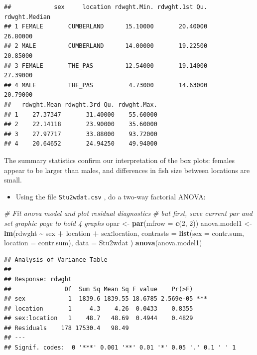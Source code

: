 \documentclass[
  12pt,
]{book}
\newenvironment{Shaded}{\begin{snugshade}}{\end{snugshade}}
\newcommand{\CommentTok}[1]{\textcolor[rgb]{0.56,0.35,0.01}{\textit{#1}}}
\newcommand{\DataTypeTok}[1]{\textcolor[rgb]{0.13,0.29,0.53}{#1}}
\newcommand{\DecValTok}[1]{\textcolor[rgb]{0.00,0.00,0.81}{#1}}
\newcommand{\KeywordTok}[1]{\textcolor[rgb]{0.13,0.29,0.53}{\textbf{#1}}}
\newcommand{\NormalTok}[1]{#1}
\newcommand{\OperatorTok}[1]{\textcolor[rgb]{0.81,0.36,0.00}{\textbf{#1}}}
\newcommand{\StringTok}[1]{\textcolor[rgb]{0.31,0.60,0.02}{#1}}
\providecommand{\tightlist}{%
  \setlength{\itemsep}{0pt}\setlength{\parskip}{0pt}}
\begin{document}
\begin{verbatim}
##            sex     location rdwght.Min. rdwght.1st Qu. rdwght.Median
## 1 FEMALE       CUMBERLAND      15.10000       20.40000      26.80000
## 2 MALE         CUMBERLAND      14.00000       19.22500      20.85000
## 3 FEMALE       THE_PAS         12.54000       19.14000      27.39000
## 4 MALE         THE_PAS          4.73000       14.63000      20.79000
##   rdwght.Mean rdwght.3rd Qu. rdwght.Max.
## 1    27.37347       31.40000    55.60000
## 2    22.14118       23.90000    35.60000
## 3    27.97717       33.88000    93.72000
## 4    20.64652       24.94250    49.94000
\end{verbatim}

The summary statistics confirm our interpretation of the box plots: females appear to be larger than males, and differences in fish size between locations are small.

\begin{itemize}
\tightlist
\item
  Using the file \texttt{Stu2wdat.csv} , do a two-way factorial ANOVA:
\end{itemize}

\begin{Shaded}
\begin{Highlighting}[]
\CommentTok{\# Fit anova model and plot residual diagnostics}
\CommentTok{\# but first, save current par and set graphic page to hold 4 graphs}
\NormalTok{opar \textless{}{-}}\StringTok{ }\KeywordTok{par}\NormalTok{(}\DataTypeTok{mfrow =} \KeywordTok{c}\NormalTok{(}\DecValTok{2}\NormalTok{, }\DecValTok{2}\NormalTok{))}
\NormalTok{anova.model1 \textless{}{-}}\StringTok{ }\KeywordTok{lm}\NormalTok{(rdwght }\OperatorTok{\textasciitilde{}}\StringTok{ }\NormalTok{sex }\OperatorTok{+}\StringTok{ }\NormalTok{location }\OperatorTok{+}\StringTok{ }\NormalTok{sex}\OperatorTok{:}\NormalTok{location,}
  \DataTypeTok{contrasts =} \KeywordTok{list}\NormalTok{(}\DataTypeTok{sex =}\NormalTok{ contr.sum, }\DataTypeTok{location =}\NormalTok{ contr.sum),}
  \DataTypeTok{data =}\NormalTok{ Stu2wdat}
\NormalTok{)}
\KeywordTok{anova}\NormalTok{(anova.model1)}
\end{Highlighting}
\end{Shaded}

\begin{verbatim}
## Analysis of Variance Table
## 
## Response: rdwght
##               Df  Sum Sq Mean Sq F value    Pr(>F)    
## sex            1  1839.6 1839.55 18.6785 2.569e-05 ***
## location       1     4.3    4.26  0.0433    0.8355    
## sex:location   1    48.7   48.69  0.4944    0.4829    
## Residuals    178 17530.4   98.49                      
## ---
## Signif. codes:  0 '***' 0.001 '**' 0.01 '*' 0.05 '.' 0.1 ' ' 1
\end{verbatim}
\end{document}
